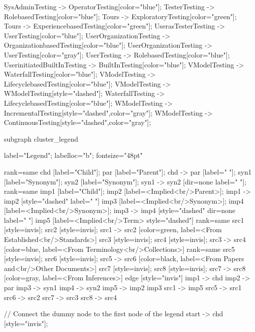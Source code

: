 \documentclass{article}
\begin{document}
{SysAdminTesting -> OperatorTesting[color="blue"];
TesterTesting -> RolebasedTesting[color="blue"];
Tours -> ExploratoryTesting[color="green"];
Tours -> ExperiencebasedTesting[color="green"];
UserasTesterTesting -> UserTesting[color="blue"];
UserOrganizationTesting -> OrganizationbasedTesting[color="blue"];
UserOrganizationTesting -> UserTesting[color="gray"];
UserTesting -> RolebasedTesting[color="blue"];
UserinitiatedBuiltInTesting -> BuiltInTesting[color="blue"];
VModelTesting -> WaterfallTesting[color="blue"];
VModelTesting -> LifecyclebasedTesting[color="blue"];
VModelTesting -> WModelTesting[style="dashed"];
WaterfallTesting -> LifecyclebasedTesting[color="blue"];
WModelTesting -> IncrementalTesting[style="dashed",color="gray"];
WModelTesting -> ContinuousTesting[style="dashed",color="gray"];

subgraph cluster_legend {

    label="Legend";
    labelloc="b";
    fontsize="48pt"

    {
        rank=same
        chd [label="Child"];
        par [label="Parent"];
        chd -> par [label="                "];
        syn1 [label="Synonym"];
        syn2 [label="Synonym"];
        syn1 -> syn2 [dir=none label="                "];
    }
    {
        rank=same
        imp1 [label="Child"];
        imp2 [label=<Implied<br/>Parent>];
        imp1 -> imp2 [style="dashed" label="                "]
        imp3 [label=<Implied<br/>Synonym>];
        imp4 [label=<Implied<br/>Synonym>];
        imp3 -> imp4 [style="dashed" dir=none label="                "]
    }
        imp5 [label=<Implied<br/>Term> style="dashed"]
{
rank=same
src1 [style=invis];
src2 [style=invis];
src1 -> src2 [color=green, label=<From Established<br/>Standards>]
src3 [style=invis];
src4 [style=invis];
src3 -> src4 [color=blue, label=<From Terminology<br/>Collections>]
}
{
rank=same
src5 [style=invis];
src6 [style=invis];
src5 -> src6 [color=black, label=<From Papers and<br/>Other Documents>]
src7 [style=invis];
src8 [style=invis];
src7 -> src8 [color=gray, label=<From Inferences>]
}
    edge [style="invis"]
    imp1 -> chd
    imp2 -> par
    imp3 -> syn1
    imp4 -> syn2
imp5 -> { imp2 imp3 }
src1 -> imp5
src5 -> src1
src6 -> src2
src7 -> src3
src8 -> src4
}

// Connect the dummy node to the first node of the legend
start -> chd [style="invis"];
}
\end{document}
